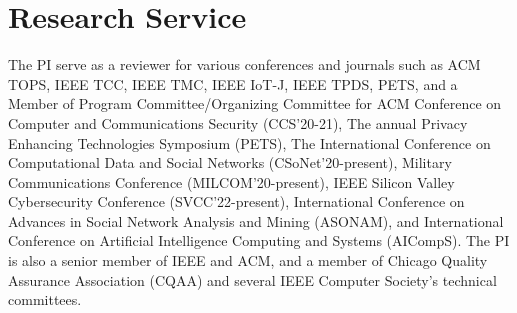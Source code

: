 \section{Research Service}
The PI serve as a reviewer for various conferences and journals such as ACM TOPS, IEEE TCC, IEEE TMC, IEEE IoT-J, IEEE TPDS, PETS, and a Member of Program Committee/Organizing Committee for ACM Conference on Computer and Communications Security (CCS'20-21), The annual Privacy Enhancing Technologies Symposium (PETS), The International Conference on Computational Data and Social Networks (CSoNet'20-present),  Military Communications Conference (MILCOM'20-present),
IEEE Silicon Valley Cybersecurity Conference (SVCC'22-present),
 International Conference on Advances in Social Network Analysis and Mining (ASONAM), and  International Conference on Artificial Intelligence Computing and Systems (AICompS).
 The PI is also a senior member of IEEE and ACM, and a member of Chicago Quality Assurance Association (CQAA) and several IEEE Computer Society's technical committees. 
 
